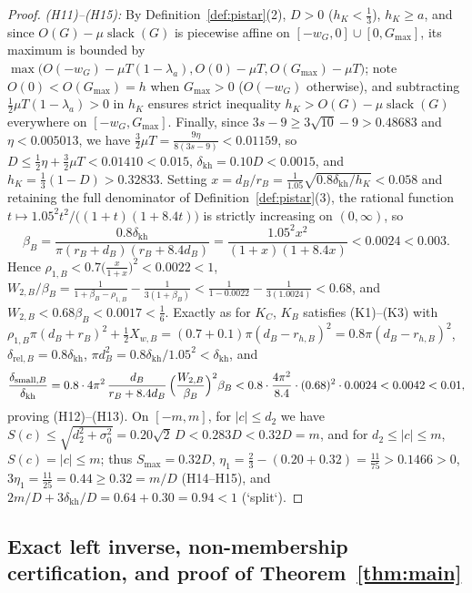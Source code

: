 \begin{proof}
\emph{(H11)--(H15):} By Definition~\ref{def:pistar}(2), $D>0$ ($h_K<\frac13$), $h_K\ge a$, and since $O(G)-\mu\operatorname{slack}(G)$
is piecewise affine on $[-w_G,0]\cup[0,G_{\max}]$, its maximum is bounded by $\max\bigl(O(-w_G)-\mu T(1-\lambda_a),O(0)-\mu T,O(G_{\max})-\mu T\bigr)$;
note $O(0)<O(G_{\max})=h$ when $G_{\max}>0$ ($O(-w_G)$ otherwise), and subtracting $\frac12\mu T(1-\lambda_a)>0$ in $h_K$
ensures strict inequality $h_K>O(G)-\mu\operatorname{slack}(G)$ everywhere on $[-w_G,G_{\max}]$.
Finally, since $3s-9\ge 3\sqrt{10}-9>0.48683$ and $\eta<0.005013$, we have $\frac32\mu T=\frac{9\eta}{8(3s-9)}<0.01159$,
so $D\le\frac12\eta+\frac32\mu T<0.01410<0.015$, $\delta_{\mathrm{kh}}=0.10D<0.0015$, and
$h_K=\frac13(1-D)>0.32833$. Setting $x=d_B/r_B=\frac{1}{1.05}\sqrt{0.8\delta_{\mathrm{kh}}/h_K}<0.058$ and retaining
the full denominator of Definition~\ref{def:pistar}(3), the rational function
$t\mapsto 1.05^2t^2/\bigl((1+t)(1+8.4t)\bigr)$ is strictly increasing on $(0,\infty)$, so
\[
 \beta_B = \frac{0.8\delta_{\mathrm{kh}}}{\pi(r_B+d_B)(r_B+8.4d_B)}
 = \frac{1.05^2x^2}{(1+x)(1+8.4x)} < 0.0024 < 0.003.
\]
Hence $\rho_{1,B}<0.7\bigl(\frac{x}{1+x}\bigr)^2<0.0022<1$,
$W_{2,B}/\beta_B=\frac{1}{1+\beta_B-\rho_{1,B}}-\frac{1}{3(1+\beta_B)}<\frac{1}{1-0.0022}-\frac{1}{3(1.0024)}<0.68$,
and $W_{2,B}<0.68\beta_B<0.0017<\frac16$. Exactly as for $K_C$, $K_B$ satisfies (K1)--(K3) with
$\rho_{1,B}\pi(d_B+r_B)^2+\frac12X_{w,B}=(0.7+0.1)\pi(d_B-r_{h,B})^2=0.8\pi(d_B-r_{h,B})^2$,
$\delta_{\mathrm{rel},B}=0.8\delta_{\mathrm{kh}}$, $\pi d_B^2=0.8\delta_{\mathrm{kh}}/1.05^2<\delta_{\mathrm{kh}}$, and
\[
 \frac{\delta_{\mathrm{small},B}}{\delta_{\mathrm{kh}}}
 = 0.8\cdot 4\pi^2\,\frac{d_B}{r_B+8.4d_B}\,\Bigl(\frac{W_{2,B}}{\beta_B}\Bigr)^2\beta_B
 < 0.8\cdot\frac{4\pi^2}{8.4}\cdot(0.68)^2\cdot 0.0024 < 0.0042 < 0.01,
\]
proving (H12)--(H13). On $[-m,m]$, for $|c|\le d_2$ we have
$S(c)\le\sqrt{d_2^2+\sigma_0^2}=0.20\sqrt2\,D<0.283D<0.32D=m$, and for $d_2\le|c|\le m$, $S(c)=|c|\le m$; thus
$S_{\max}=0.32D$, $\eta_1=\frac23-(0.20+0.32)=\frac{11}{75}>0.1466>0$, $3\eta_1=\frac{11}{25}=0.44\ge0.32=m/D$ (H14--H15),
and $2m/D+3\delta_{\mathrm{kh}}/D=0.64+0.30=0.94<1$ (`split`).
\end{proof}

\subsection{Exact left inverse, non-membership certification, and proof of Theorem~\ref{thm:main}}\label{sec:proof-end}

